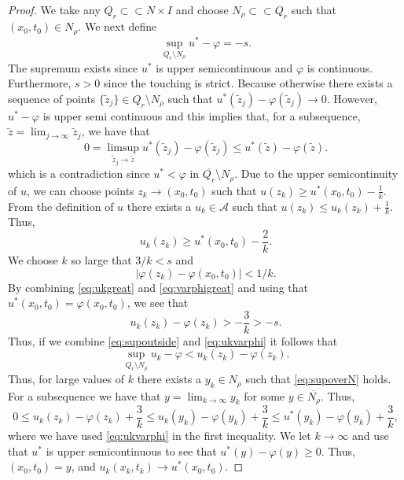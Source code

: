 \documentclass[11pt]{article}
\providecommand{\Ns}{N \times I}
\numberwithin{equation}{section}
\theoremstyle{definition}
\begin{document}
\begin{proof}     
     We take any $Q_r \subset \subset \Ns$  and choose $N_{\rho} \subset \subset Q_r$ such that $(x_0,t_0) \in N_{\rho}$. We next define
    \begin{equation}\label{eq:supoutside}
        \sup_{Q_r \setminus N_{\rho}} u^*-\varphi = -s.
    \end{equation}
    The supremum exists since $u^*$ is upper semicontinuous and $\varphi$ is continuous. Furthermore, $s>0$ since the touching is strict. Because otherwise there exists a sequence of points $\{\tilde{z}_j\} \in Q_r \setminus N_{\rho}$ such that $u^*(\tilde{z}_j)-\varphi(\tilde{z}_j) \to 0$. However, $u^*-\varphi$ is upper semi continuous and this implies that, for a subsequence, $\tilde{z} = \lim_{j \to \infty }\tilde{z}_j$, we have that
    $$
    0 = \limsup_{\tilde{z}_j \to \tilde{z}} u^*(\tilde{z}_j)-\varphi(\tilde{z}_j) \leq u^*(\tilde{z})-\varphi(\tilde{z}).
    $$
    which is a contradiction since $ u^* < \varphi$ in $\overline{Q_r} \setminus N_{\rho}$. Due to the upper semicontinuity of $u$, we can choose points $z_k \to (x_0,t_0)$ such that $u(z_k) \geq u^*(x_0,t_0)-\frac{1}{k}$. From the definition of $u$ there exists a $u_k \in \mathcal{A}$ such that $u(z_k) \leq u_k(z_k)+ \frac{1}{k}$. Thus,
    \begin{equation}\label{eq:ukgreat}
        u_k(z_k)\geq u^*(x_0,t_0) -\frac{2}{k}.
    \end{equation}
    We choose $k$ so large that $3/k < s$ and
    \begin{equation}\label{eq:varphigreat}
        |\varphi(z_k)-\varphi(x_0,t_0)| < 1/k.
    \end{equation}
    By combining \eqref{eq:ukgreat} and \eqref{eq:varphigreat} and using that $u^*(x_0,t_0)=\varphi(x_0,t_0)$, we see that
    \begin{equation}\label{eq:ukvarphi}
        u_k(z_k)-\varphi(z_k) > - \frac{3}{k} >-s.
    \end{equation}
    Thus, if we combine \eqref{eq:supoutside} and \eqref{eq:ukvarphi} it follows that
    \begin{equation}
         \sup_{Q_r \setminus N_{\rho}} u_k-\varphi < u_k(z_k)-\varphi(z_k).
    \end{equation}
    Thus, for large values of $k$ there exists a $y_k \in N_{\rho}$ such that \eqref{eq:supoverN} holds.
   For a subsequence we have that
   $y = \lim_{k \to \infty} y_k$ for some $y \in \overline{N_{\rho}}$. Thus,
   $$
  0\leq u_k(z_k)-\varphi(z_k)+\frac{3}{k} \leq  u_k(y_k)-\varphi(y_k)+\frac{3}{k}  \leq u^*(y_k)-\varphi(y_k)+\frac{3}{k},
   $$
   where we have used \eqref{eq:ukvarphi} in the first inequality. We let $k\to \infty$ and use that $u^*$ is upper semicontinuous to see that $u^*(y)-\varphi(y) \geq0$. Thus, $(x_0,t_0)=y$, and $u_k(x_k,t_k) \to u^*(x_0,t_0)$. 
\end{proof}

 




\end{document}
